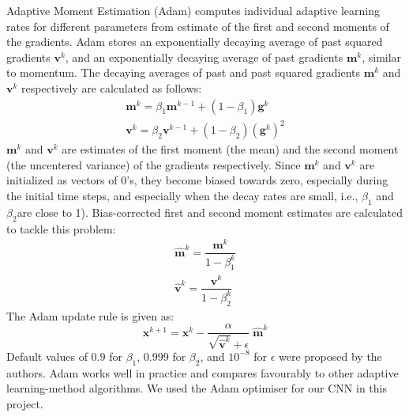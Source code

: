 \documentclass[12pt]{report}
\numberwithin{equation}{section}
\begin{document}
Adaptive Moment Estimation (Adam) {\cite{kingma2014adam}} computes individual adaptive learning rates for different parameters from estimate of the first and second moments of the gradients. Adam stores an exponentially decaying average of past squared gradients $\bm{v}^k$, and an exponentially decaying average of past gradients $\bm{m}^k$, similar to momentum. The decaying averages of past and past squared gradients $\bm{m}^k$ and $\bm{v}^k$ respectively are calculated as follows:
\begin{equation}\label{eqn:adam_mean}
\begin{array}{l}
\bm{m}^k = \beta_1\bm{m}^{k-1} + (1-\beta_1)\bm{g}^k \\
\bm{v}^k = \beta_2\bm{v}^{k-1} + (1-\beta_2)(\bm{g}^k)^2
\end{array}
\end{equation} \noindent
$\bm{m}^k$ and $\bm{v}^k$ are estimates of the first moment (the mean) and the second moment (the uncentered variance) of the gradients respectively. Since $\bm{m}^k$ and $\bm{v}^k$ are initialized as vectors of $0$'s, they become biased towards zero, especially during the initial time steps, and especially when the decay rates are small, i.e., $\beta_1$ and $\beta_2$are close to 1). Bias-corrected first and second moment estimates are calculated to tackle this problem:
\begin{equation}\label{eqn:adam_bias}
\begin{array}{l}
\hat{\bm{m}}^k = \dfrac{\bm{m}^k}{1-\beta^k_1} \\
\hat{\bm{v}}^k = \dfrac{\bm{v}^k}{1-\beta^k_2}
\end{array}
\end{equation}\noindent
The Adam update rule is given as:
\begin{equation}\label{eqn:adam}
\bm{x}^{k+1} = \bm{x}^{k} - \dfrac{\alpha}{\sqrt{\hat{\bm{v}}^k} + \epsilon}\; \hat{\bm{m}}^k
\end{equation}\noindent
Default values of $0.9$ for $\beta_1$, $0.999$ for $\beta_2$, and $10^{-8}$ for $\epsilon$ were proposed by the authors. Adam works well in practice and compares favourably to other adaptive learning-method algorithms. We used the Adam optimiser for our CNN in this project.
\end{document}
